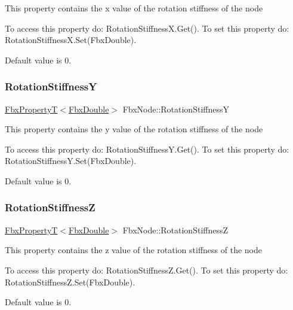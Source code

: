 This property contains the x value of the rotation stiffness of the node

To access this property do\+: Rotation\+Stiffness\+X.\+Get(). To set this property do\+: Rotation\+Stiffness\+X.\+Set(\+Fbx\+Double).

Default value is 0. \mbox{\label{class_fbx_node_a95e74933f4fcdbf6da893462ade3181f}} 
\subsubsection{\texorpdfstring{Rotation\+StiffnessY}{RotationStiffnessY}}
{\footnotesize\ttfamily \hyperlink{class_fbx_property_t}{Fbx\+PropertyT}$<$\hyperlink{fbxtypes_8h_a171e72a1c46fc15c1a6c9c31948c1c5b}{Fbx\+Double}$>$ Fbx\+Node\+::\+Rotation\+StiffnessY}

This property contains the y value of the rotation stiffness of the node

To access this property do\+: Rotation\+Stiffness\+Y.\+Get(). To set this property do\+: Rotation\+Stiffness\+Y.\+Set(\+Fbx\+Double).

Default value is 0. \mbox{\label{class_fbx_node_a9465fe60724712661ce0f0cd3cb26235}} 
\subsubsection{\texorpdfstring{Rotation\+StiffnessZ}{RotationStiffnessZ}}
{\footnotesize\ttfamily \hyperlink{class_fbx_property_t}{Fbx\+PropertyT}$<$\hyperlink{fbxtypes_8h_a171e72a1c46fc15c1a6c9c31948c1c5b}{Fbx\+Double}$>$ Fbx\+Node\+::\+Rotation\+StiffnessZ}

This property contains the z value of the rotation stiffness of the node

To access this property do\+: Rotation\+Stiffness\+Z.\+Get(). To set this property do\+: Rotation\+Stiffness\+Z.\+Set(\+Fbx\+Double).

Default value is 0. \mbox{\label{class_fbx_node_a4e49b1c82db99e0b2369e8c9563e5ef7}} 
